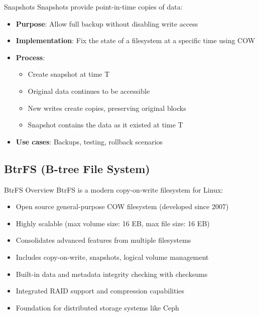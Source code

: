 \begin{definition}{Snapshots}
    Snapshots provide point-in-time copies of data:
    \begin{itemize}
        \item \textbf{Purpose}: Allow full backup without disabling write access
        \item \textbf{Implementation}: Fix the state of a filesystem at a specific time using COW
        \item \textbf{Process}:
            \begin{itemize}
                \item Create snapshot at time T
                \item Original data continues to be accessible
                \item New writes create copies, preserving original blocks
                \item Snapshot contains the data as it existed at time T
            \end{itemize}
        \item \textbf{Use cases}: Backups, testing, rollback scenarios
    \end{itemize}
\end{definition}

\raggedcolumns
\columnbreak

\subsection{BtrFS (B-tree File System)}

\begin{definition}{BtrFS Overview}
    BtrFS is a modern copy-on-write filesystem for Linux:
    \begin{itemize}
        \item Open source general-purpose COW filesystem (developed since 2007)
        \item Highly scalable (max volume size: 16 EB, max file size: 16 EB)
        \item Consolidates advanced features from multiple filesystems
        \item Includes copy-on-write, snapshots, logical volume management
        \item Built-in data and metadata integrity checking with checksums
        \item Integrated RAID support and compression capabilities
        \item Foundation for distributed storage systems like Ceph
    \end{itemize}
\end{definition}

